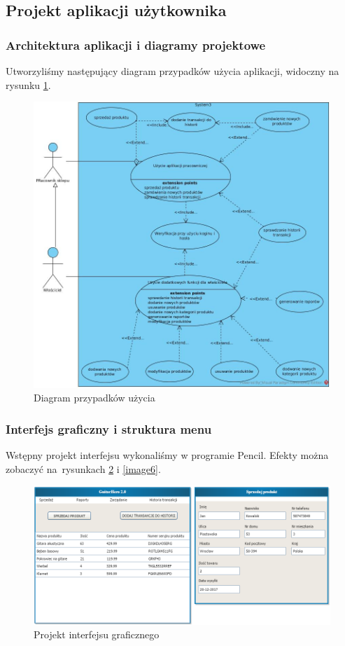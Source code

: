 \newpage
\subsection{Projekt aplikacji użytkownika}
\subsubsection{Architektura aplikacji i diagramy projektowe}

Utworzyliśmy następujący diagram przypadków użycia aplikacji, widoczny na rysunku \ref{image4}.

\begin{figure}[h]
	\centering
	\includegraphics[width=0.8\linewidth]{images/image4.jpg}
	\caption{Diagram przypadków użycia}
	\label{image4}
\end{figure}

\newpage
\subsubsection{Interfejs graficzny i struktura menu}

Wstępny projekt interfejsu wykonaliśmy w programie Pencil. Efekty można zobaczyć na~rysunkach \ref{image5} i \ref{image6}.

\begin{figure}[h]
	\centering
	\includegraphics[width=0.8\linewidth]{images/image5.png}
	\caption{Projekt interfejsu graficznego}
	\label{image5}
\end{figure}

